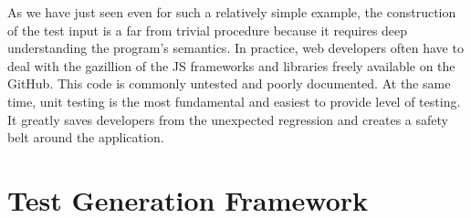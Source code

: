\documentclass[sigconf]{acmart}
\begin{document}
As we have just seen even for such a relatively simple example, the construction of the test input is a far from trivial procedure because it requires deep understanding the program's semantics. In practice, web developers often have to deal with the gazillion of the JS frameworks and libraries freely available on the GitHub. This code is commonly untested and poorly documented. At the same time, unit testing is the most fundamental and easiest to provide level of testing. It greatly saves developers from the unexpected regression and creates a safety belt around the application.

\section{Test Generation Framework}
\label{sec.framework}
\end{document}

